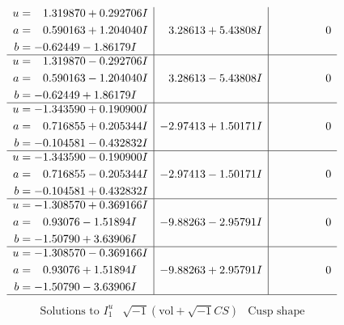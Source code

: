 \documentclass[1p]{elsarticle_modified}
\theoremstyle{definition}
\newcommand{\I}{\sqrt{-1}}
\begin{document}
$$\begin{array}{c|c|c}
\begin{aligned}
u &= \phantom{-}1.319870 + 0.292706 I \\
a &= \phantom{-}0.590163 + 1.204040 I \\
b &= -0.62449 - 1.86179 I\end{aligned}
 & \phantom{-}3.28613 + 5.43808 I & \phantom{-0.000000 } 0 \\ \hline\begin{aligned}
u &= \phantom{-}1.319870 - 0.292706 I \\
a &= \phantom{-}0.590163 - 1.204040 I \\
b &= -0.62449 + 1.86179 I\end{aligned}
 & \phantom{-}3.28613 - 5.43808 I & \phantom{-0.000000 } 0 \\ \hline\begin{aligned}
u &= -1.343590 + 0.190900 I \\
a &= \phantom{-}0.716855 + 0.205344 I \\
b &= -0.104581 - 0.432832 I\end{aligned}
 & -2.97413 + 1.50171 I & \phantom{-0.000000 } 0 \\ \hline\begin{aligned}
u &= -1.343590 - 0.190900 I \\
a &= \phantom{-}0.716855 - 0.205344 I \\
b &= -0.104581 + 0.432832 I\end{aligned}
 & -2.97413 - 1.50171 I & \phantom{-0.000000 } 0 \\ \hline\begin{aligned}
u &= -1.308570 + 0.369166 I \\
a &= \phantom{-}0.93076 - 1.51894 I \\
b &= -1.50790 + 3.63906 I\end{aligned}
 & -9.88263 - 2.95791 I & \phantom{-0.000000 } 0 \\ \hline\begin{aligned}
u &= -1.308570 - 0.369166 I \\
a &= \phantom{-}0.93076 + 1.51894 I \\
b &= -1.50790 - 3.63906 I\end{aligned}
 & -9.88263 + 2.95791 I & \phantom{-0.000000 } 0\\
 \hline 
 \end{array}$$\newpage$$\begin{array}{c|c|c}  
\text{Solutions to }I^u_{1}& \I (\text{vol} + \sqrt{-1}CS) & \text{Cusp shape}\\
 \hline 
\begin{aligned}

\end{aligned}
\end{array}$$
\end{document}
